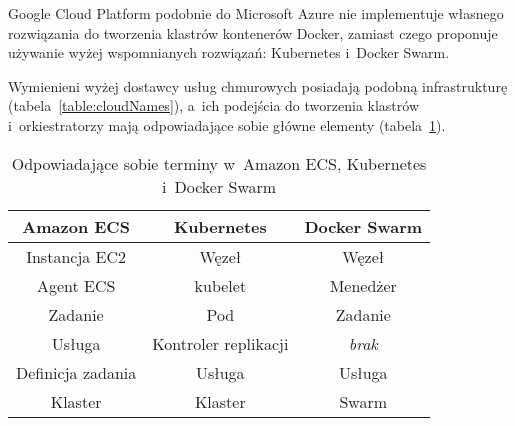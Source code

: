 Google Cloud Platform podobnie do Microsoft Azure nie implementuje własnego rozwiązania do tworzenia klastrów kontenerów Docker, zamiast czego proponuje używanie wyżej wspomnianych rozwiązań: Kubernetes i~Docker Swarm.

Wymienieni wyżej dostawcy usług chmurowych posiadają podobną infrastrukturę (tabela~\ref{table:cloudNames}), a~ich podejścia do tworzenia klastrów i~orkiestratorzy mają odpowiadające sobie główne elementy (tabela~\ref{table:clusters}).

\begin{table}[ht]
    \centering
    \begin{tabular}{|c|c|c|}
        \hline
        \textbf{Amazon ECS} & \textbf{Kubernetes} & \textbf{Docker Swarm} \\
        \hline
        Instancja EC2 & Węzeł & Węzeł \\
        \hline
        Agent ECS & kubelet & Menedżer \\
        \hline
        Zadanie & Pod & Zadanie \\
        \hline
        Usługa & Kontroler replikacji & \textit{brak} \\
        \hline
        Definicja zadania & Usługa & Usługa \\
        \hline
        Klaster & Klaster & Swarm \\
        \hline
    \end{tabular}
    \caption{Odpowiadające sobie terminy w~Amazon ECS, Kubernetes i~Docker Swarm}
    \label{table:clusters}
\end{table}
